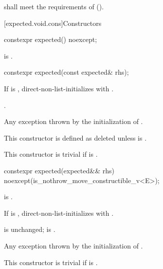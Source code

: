 \pnum
{} shall meet the requirements of
 ().

[expected.void.cons]{Constructors}

%
\begin{itemdecl}
constexpr expected() noexcept;
\end{itemdecl}

\begin{itemdescr}
\pnum
\ensures
{} is .
\end{itemdescr}

%
\begin{itemdecl}
constexpr expected(const expected& rhs);
\end{itemdecl}

\begin{itemdescr}
\pnum
\effects
If  is ,
direct-non-list-initializes  with .

\pnum
\ensures
{}.

\pnum
\throws
Any exception thrown by the initialization of .

\pnum
\remarks
This constructor is defined as deleted
unless  is .

\pnum
This constructor is trivial
if  is .
\end{itemdescr}

%
\begin{itemdecl}
constexpr expected(expected&& rhs) noexcept(is_nothrow_move_constructible_v<E>);
\end{itemdecl}

\begin{itemdescr}
\pnum
\constraints
{} is .

\pnum
\effects
If  is ,
direct-non-list-initializes  with .

\pnum
\ensures
{} is unchanged;
 is .

\pnum
\throws
Any exception thrown by the initialization of .

\pnum
\remarks
This constructor is trivial
if  is .
\end{itemdescr}

